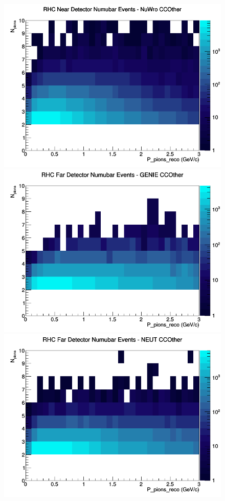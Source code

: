 \documentclass[12pt]{article}
\begin{document}
\begin{figure}[h]
\includegraphics[width=\linewidth]{eff_N_P/LAr/pions/CCOther_RHC_ND_numubar_N_P_NuWro.png}
\endminipage
\newline
{}
\includegraphics[width=\linewidth]{eff_N_P/LAr/pions/CCOther_RHC_FD_numubar_N_P_GENIE.png}
\endminipage
{}
\includegraphics[width=\linewidth]{eff_N_P/LAr/pions/CCOther_RHC_FD_numubar_N_P_NEUT.png}

\end{figure}
\end{document}

